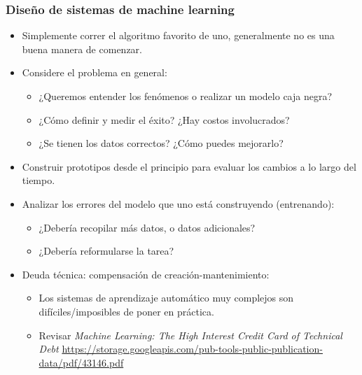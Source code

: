 \documentclass[a4paper, 11pt]{article}
\begin{document}
\subsubsection{Diseño de sistemas de machine learning}

\begin{itemize}
    \item Simplemente correr el algoritmo favorito de uno, generalmente no es una buena manera de comenzar.
    \item Considere el problema en general:
    \begin{itemize}
        \item ¿Queremos entender los fenómenos o realizar un modelo caja negra?
        \item ¿Cómo definir y medir el éxito? ¿Hay costos involucrados?
        \item ¿Se tienen los datos correctos? ¿Cómo puedes mejorarlo?
    \end{itemize}
    \item Construir prototipos desde el principio para evaluar los cambios a lo largo del tiempo.
    \item Analizar los errores del modelo que uno está construyendo (entrenando):
    \begin{itemize}
        \item ¿Debería recopilar más datos, o datos adicionales?
        \item ¿Debería reformularse la tarea?
    \end{itemize}
    \item Deuda técnica: compensación de creación-mantenimiento:
    \begin{itemize}
        \item Los sistemas de aprendizaje automático muy complejos son difíciles/imposibles de poner en práctica.
        \item Revisar \textit{Machine Learning: The High Interest Credit Card of Technical Debt} \url{https://storage.googleapis.com/pub-tools-public-publication-data/pdf/43146.pdf}
    \end{itemize}
\end{itemize}
\end{document}

